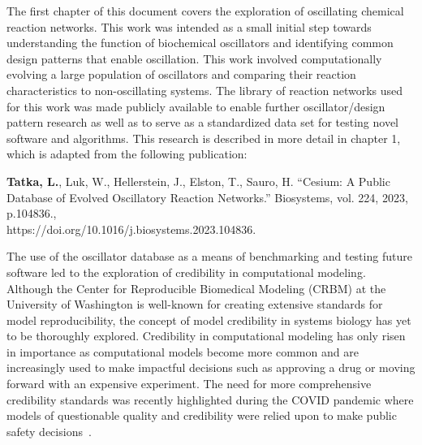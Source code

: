 \documentclass[12pt]{report}
\begin{document}
The first chapter of this document covers the exploration of oscillating chemical reaction networks. This work was intended as a small initial step towards understanding the function of biochemical oscillators and identifying common design patterns that enable oscillation. This work involved computationally evolving a large population of oscillators and comparing their reaction characteristics to non-oscillating systems. The library of reaction networks used for this work was made publicly available to enable further oscillator/design pattern research as well as to serve as a standardized data set for testing novel software and algorithms. This research is described in more detail in chapter 1, which is adapted from the following publication:
\\


\begin{adjustwidth}{2cm}{}
\textbf{Tatka, L.}, Luk, W., Hellerstein, J., Elston, T., Sauro, H. “Cesium: A Public Database of Evolved Oscillatory Reaction Networks.”  Biosystems, vol. 224, 2023, p.104836., \\
https://doi.org/10.1016/j.biosystems.2023.104836. 
\\
\end{adjustwidth}

The use of the oscillator database as a means of benchmarking and testing future software led to the exploration of credibility in computational modeling. Although the Center for Reproducible Biomedical Modeling (CRBM) at the University of Washington is well-known for creating extensive standards for model reproducibility, the concept of model credibility in systems biology has yet to be thoroughly explored. Credibility in computational modeling has only risen in importance as computational models become more common and are increasingly used to make impactful decisions such as approving a drug or moving forward with an expensive experiment. The need for more comprehensive credibility standards was recently highlighted during the COVID pandemic where models of questionable quality and credibility were relied upon to make public safety decisions~\cite{Gnanvi2021}.
\end{document}
